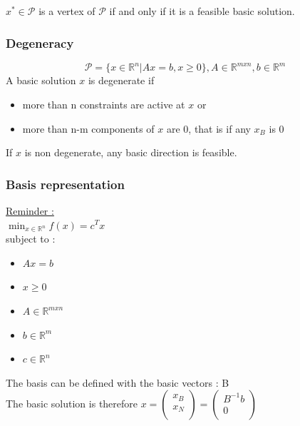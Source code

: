 \documentclass[../main.tex]{subfiles}
\begin{document}
\begin{theoremen}
    $x^* \in \mathcal{P}$ is a vertex of $\mathcal{P}$ if and only if it is a feasible basic solution.\\
\end{theoremen}

\subsubsection{Degeneracy}
\begin{equation}
    \mathcal{P} = \{x \in \mathbb{R}^n | Ax=b, x \geq 0\}, A \in \mathbb{R}^{mxn}, b\in \mathbb{R}^m
\end{equation}
A basic solution $x$ is degenerate if \begin{itemize}
    \item more than n constraints are active at $x$ or\\
    \item more than n-m components of $x$ are 0, that is if any $x_B$ is 0\\
\end{itemize}

\begin{theoremen}
    If $x$ is non degenerate, any basic direction is feasible.\\
\end{theoremen}

\subsubsection{Basis representation}
\quad \underline{Reminder :} \\
$\min_{x\in \mathbb{R}^n} f(x) = c^T x$\\
subject to : \begin{itemize}
    \item $Ax=b$\\
    \item $x\geq 0$\\
    \item $A\in \mathbb{R}^{mxn}$\\
    \item $b\in \mathbb{R}^m$\\
    \item $c \in \mathbb{R}^n$\\
\end{itemize}

The basis can be defined with the basic vectors : B\\
The basic solution is therefore $x = \begin{pmatrix}
    x_B\\
    x_N\\
\end{pmatrix} = \begin{pmatrix}
    B^{-1} b\\0\\
\end{pmatrix}$\\
\end{document}
